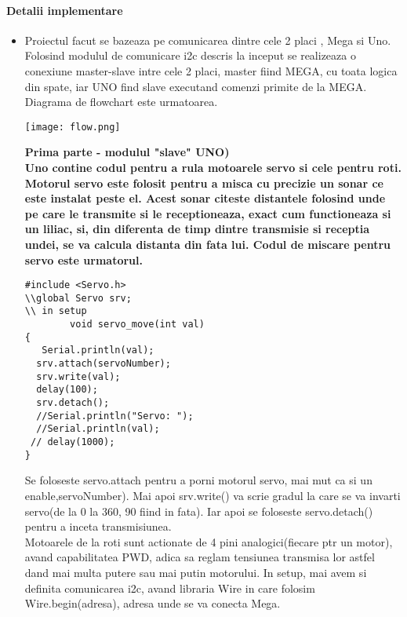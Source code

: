 \paragraph{Detalii implementare}
\begin{itemize}
\item
	\tab Proiectul facut se bazeaza pe comunicarea dintre cele 2 placi , Mega si Uno. Folosind modulul de comunicare i2c descris la inceput se realizeaza o conexiune master-slave intre cele 2 placi, master fiind MEGA, cu toata logica din spate, iar UNO find slave executand comenzi primite de la MEGA.\\
	\tab Diagrama de flowchart este urmatoarea.\\
	\begin{center}
	\texttt{[image: flow.png]}\\
	\end{center}
	\tab\tab \bf{Prima parte - modulul "slave" UNO)}\\
	\tab Uno contine codul pentru a rula motoarele servo si cele pentru roti. Motorul servo este folosit pentru a misca cu precizie un sonar ce este instalat peste el. Acest sonar citeste distantele folosind unde pe care le transmite si le receptioneaza, exact cum functioneaza si un liliac, si, din diferenta de timp dintre transmisie si receptia undei, se va calcula distanta din fata lui. Codul de miscare pentru servo este urmatorul.\\
	\begin{verbatim}
#include <Servo.h>
\\global Servo srv;
\\ in setup 
		void servo_move(int val)
{
   Serial.println(val);
  srv.attach(servoNumber);
  srv.write(val);
  delay(100);
  srv.detach();
  //Serial.println("Servo: ");
  //Serial.println(val);
 // delay(1000);
}
	\end{verbatim}
	\tab Se foloseste servo.attach pentru a porni motorul servo, mai mut ca si un enable,servoNumber). Mai apoi srv.write() va scrie gradul la care se va invarti servo(de la 0 la 360, 90 fiind in fata). Iar apoi se foloseste servo.detach() pentru a inceta transmisiunea.\\

	\tab Motoarele de la roti sunt actionate de 4 pini analogici(fiecare ptr un motor), avand capabilitatea PWD, adica sa reglam tensiunea transmisa lor astfel dand mai multa putere sau mai putin motorului. In setup, mai avem si definita comunicarea i2c, avand libraria Wire in care folosim Wire.begin(adresa), adresa unde se va conecta Mega.\\


\end{itemize}
